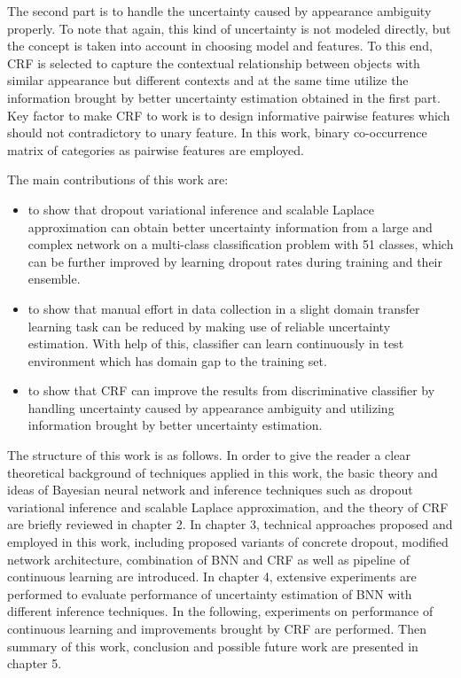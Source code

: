 The second part is to handle the uncertainty caused by appearance ambiguity properly. To note that again, this kind of uncertainty is not modeled directly, but the concept is taken into account in choosing model and features. To this end, \gls{CRF} is selected to capture the contextual relationship between objects with similar appearance but different contexts and at the same time utilize the information brought by better uncertainty estimation obtained in the first part. Key factor to make \gls{CRF} to work is to design informative pairwise features which should not contradictory to unary feature. In this work, binary co-occurrence matrix of categories as pairwise features are employed.

The main contributions of this work are:
\begin{itemize}
	\item to show that dropout variational inference and scalable Laplace approximation can obtain better uncertainty information from a large and complex network on a multi-class classification problem with 51 classes, which can be further improved by learning dropout rates during training and their ensemble.
	\item to show that manual effort in data collection in a slight domain transfer learning task can be reduced by making use of reliable uncertainty estimation. With help of this, classifier can learn continuously in test environment which has domain gap to the training set.
	\item to show that \gls{CRF} can improve the results from discriminative classifier by handling uncertainty caused by appearance ambiguity and utilizing information brought by better uncertainty estimation.
\end{itemize}

The structure of this work is as follows. In order to give the reader a clear theoretical background of techniques applied in this work, the basic theory and ideas of Bayesian neural network and inference techniques such as dropout variational inference and scalable Laplace approximation, and the theory of \gls{CRF} are briefly reviewed in chapter 2. In chapter 3, technical approaches proposed and employed in this work, including proposed variants of concrete dropout, modified network architecture, combination of \gls{BNN} and \gls{CRF} as well as pipeline of continuous learning are introduced. In chapter 4, extensive experiments are performed to evaluate performance of uncertainty estimation of \gls{BNN} with different inference techniques. In the following, experiments on performance of continuous learning and improvements brought by \gls{CRF} are performed. Then summary of this work, conclusion and possible future work are presented in chapter 5.

